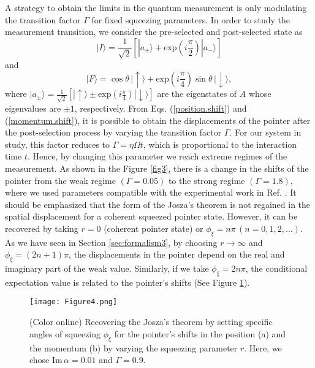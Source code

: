 \documentclass[aps,pra,preprint,superscriptaddress, showpacs]{revtex4-2}
\begin{document}
A strategy to obtain the limits in the quantum measurement is only modulating the transition factor $\Gamma$ \cite{pan2020weak} for fixed squeezing parameters. In order to study the measurement transition, we consider the pre-selected and post-selected state as
\begin{equation}
|I\rangle=\frac{1}{\sqrt{2}}\left[|a_{+}\rangle+\textrm{exp}\left(i\frac{\pi}{2}\right)|a_{-}\rangle\right]
\end{equation} 
and
\begin{equation}
|F\rangle=\cos\theta\,|\uparrow\rangle+\textrm{exp}\left(i\frac{\pi}{4}\right)\sin\theta\,|\downarrow\rangle,
\end{equation}
where $|a_{\pm}\rangle=\frac{1}{\sqrt{2}}\left[|\uparrow\rangle\pm\textrm{exp}\left(i\frac{\pi}{4}\right)|\downarrow\rangle\right]$ are the eigenstates of $A$ whose eigenvalues are $\pm 1$, respectively. From Eqs. (\ref{position.shift}) and (\ref{momentum.shift}), it is possible to obtain the displacements of the pointer after the post-selection process by varying the transition factor $\Gamma$. For our system in study, this factor reduces to $\Gamma=\eta\Omega t$, which is proportional to the interaction time $t$. Hence, by changing this parameter we reach extreme regimes of the measurement. As shown in the Figure \ref{fig3}, there is a change in the shifts of the pointer from the weak regime $(\Gamma = 0.05)$ to the strong regime $(\Gamma=1.8)$, where we used parameters compatible with the experimental work in Ref. \cite{pan2020weak}. It should be emphasized that the form of the Josza's theorem \cite{jozsa2007complex} is not regained in the spatial displacement for a coherent squeezed pointer state. However, it can be recovered by taking $r=0$ (coherent pointer state) or $\phi_{\xi}=n\pi\,(n=0,1,2,\ldots)$. As we have seen in Section \ref{sec:formalism3}, by choosing $r \rightarrow \infty$ and $\phi_{\xi}=(2n+1)\pi$, the displacements in the pointer depend on the real and imaginary part of the weak value. Similarly, if we take $\phi_{\xi}=2n\pi$, the conditional expectation value is related to the pointer's shifts (See Figure \ref{fig4}).   

\begin{figure}[h!]
	\centering
	\texttt{[image: Figure4.png]}
	\caption{(Color online) Recovering the Josza's theorem by setting specific angles of squeezing $\phi_{\xi}$ for the pointer's shifts in the position (a) and the momentum (b) by varying the squeezing parameter $r$. Here, we chose $\textrm{Im}\,\alpha=0.01$ and $\Gamma=0.9$.}
	\label{fig4}
\end{figure}
\end{document}
